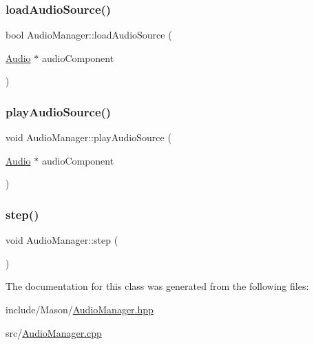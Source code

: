 \hypertarget{class_mason_1_1_audio_manager_ae8264e1149615ee5b3cc54317bd0fe4a}{}\label{class_mason_1_1_audio_manager_ae8264e1149615ee5b3cc54317bd0fe4a} 
\subsubsection{\texorpdfstring{load\+Audio\+Source()}{loadAudioSource()}}
{\footnotesize\ttfamily bool Audio\+Manager\+::load\+Audio\+Source (\begin{DoxyParamCaption}\item[{\hyperlink{class_mason_1_1_audio}{Audio} $\ast$}]{audio\+Component }\end{DoxyParamCaption})}

\hypertarget{class_mason_1_1_audio_manager_a061109c8b24705aa7ed1a5c28b9a4cd1}{}\label{class_mason_1_1_audio_manager_a061109c8b24705aa7ed1a5c28b9a4cd1} 
\subsubsection{\texorpdfstring{play\+Audio\+Source()}{playAudioSource()}}
{\footnotesize\ttfamily void Audio\+Manager\+::play\+Audio\+Source (\begin{DoxyParamCaption}\item[{\hyperlink{class_mason_1_1_audio}{Audio} $\ast$}]{audio\+Component }\end{DoxyParamCaption})}

\hypertarget{class_mason_1_1_audio_manager_a81eb2ff2bc2d1242e532c208b32d17ec}{}\label{class_mason_1_1_audio_manager_a81eb2ff2bc2d1242e532c208b32d17ec} 
\subsubsection{\texorpdfstring{step()}{step()}}
{\footnotesize\ttfamily void Audio\+Manager\+::step (\begin{DoxyParamCaption}{ }\end{DoxyParamCaption})}



The documentation for this class was generated from the following files\+:\begin{DoxyCompactItemize}
\item 
include/\+Mason/\hyperlink{_audio_manager_8hpp}{Audio\+Manager.\+hpp}\item 
src/\hyperlink{_audio_manager_8cpp}{Audio\+Manager.\+cpp}\end{DoxyCompactItemize}
